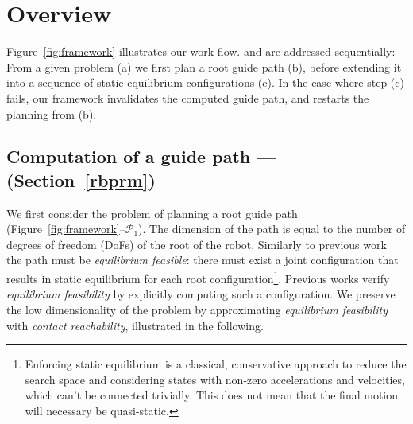 \documentclass[journal]{IEEEtran}
\providecommand{\DIFaddend}{\protect\color{black}} %
\begin{document}
\DIFaddend %
\section{Overview}
\label{overview}


Figure~\ref{fig:framework} illustrates our work flow.
\Pa and \Pb are addressed sequentially: From a given problem (a) we first plan a root guide path (b), before
extending it into a sequence of static equilibrium configurations (c). In the case where step (c) fails,
our framework invalidates the computed guide path, and restarts the planning from (b).

%

\subsection{Computation of a guide path --- \Pa (Section~\ref{rbprm})}
We first consider the problem of planning a root guide path (Figure~\ref{fig:framework}--$\mathcal{P}_1$).  The dimension of the path is equal to the number of degrees of freedom (DoFs) of the root of the robot.
Similarly to previous work~\citep{Bouyarmane2009} the path must be \textit{equilibrium feasible}: there must exist a joint configuration that results in static equilibrium for each root configuration\footnote{Enforcing static equilibrium is a classical, conservative approach to reduce the search space and considering states  with non-zero accelerations and velocities, which can't be connected trivially. This does not mean that the final motion will necessary be quasi-static.}. Previous works verify \textit{equilibrium feasibility} by explicitly computing such a configuration. We preserve the low dimensionality of the problem by approximating \textit{equilibrium feasibility} with \textit{contact reachability}, illustrated in the following.
\end{document}
